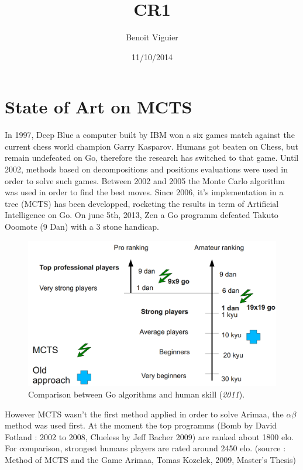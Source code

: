 \documentclass[12pt]{article}
\title{CR1}
\author{Benoit Viguier}
\date{11/10/2014}
\begin{document}
\maketitle
\section{State of Art on MCTS}

In 1997, Deep Blue a computer built by IBM won a six games match against the current chess world champion Garry Kasparov. Humans got beaten on Chess, but remain undefeated on Go, therefore the research has switched to that game. Until 2002, methods based on decompositions and positions evaluations were used in order to solve such games. Between 2002 and 2005 the Monte Carlo algorithm was used in order to find the best moves. Since 2006, it's implementation in a tree (MCTS) has been developped, rocketing the results in term of Artificial Intelligence on Go. On june 5th, 2013, Zen a Go programm defeated Takuto Ooomote (9 Dan) with a 3 stone handicap.
\begin{figure}[H]
\centering
\includegraphics[width=15cm]{img/ranking.png}
\caption{\label{fig:ranking}Comparison between Go algorithms and human skill (\textit{2011}).}
\end{figure}
\newpage
However MCTS wasn't the first method applied in order to solve Arimaa, the \ensuremath{\alpha\beta} method was used first. At the moment the top programms (Bomb by David Fotland : 2002 to 2008, Clueless by Jeff Bacher 2009) are ranked about 1800 elo. For comparison, strongest humans players are rated around 2450 elo. (source : Method of MCTS and the Game Arimaa, Tomas Kozelek, 2009, Master's Thesis)
\end{document}
